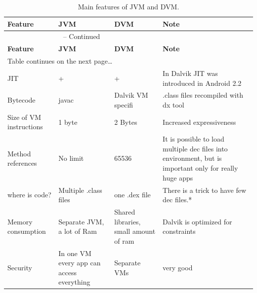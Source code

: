 \documentclass[11pt, oneside]{article}   	%
\begin{document}
\begin{longtable}{| p{3cm} | p{2cm} | p{2cm} | p{7cm} |}
\caption{Main features of JVM and DVM.\label{table:comparison}}\\
\hline \hline
{\textbf{Feature}} &
{\textbf{JVM}} &
{\textbf{DVM}} &
{\textbf{Note}} \\
\hline
\endfirsthead

\multicolumn{3}{c}{{\tablename} \thetable{} -- Continued} \\[0.5ex]
\hline \hline
{\textbf{Feature}} &
{\textbf{JVM}} &
{\textbf{DVM}} &
{\textbf{Note}} \\
\hline
\endhead
\multicolumn{3}{l}{{Table continues on the next page\ldots}} \\
\endfoot
\hline \hline
\endlastfoot

\hline
JIT
&
+
&
+
& In Dalvik JIT was introduced in Android 2.2
\\ \hline
Bytecode	
&
javac
& 
Dalvik VM specifi
& .class files recompiled with dx tool
\\ \hline
Size of VM instructions
&
1 byte
&
2 Bytes
&
Increased expressiveness
\\ \hline
Method references
&
No limit
&
65536
&
It is possible to load multiple dec files into environment, but is important only for really huge apps 
\\ \hline
where is code?
&
Multiple .class files
&
one .dex file
&
There is a trick to have few dec files.*
\\ \hline
Memory consumption
&
Separate JVM, a lot of Ram
&
Shared libraries, small amount of ram
&
Dalvik is optimized for constraints
\\ \hline
Security
&
In one VM every app can access everything
&
Separate VMs
&
very good
\\
\hline
\end{longtable}
\end{document}
